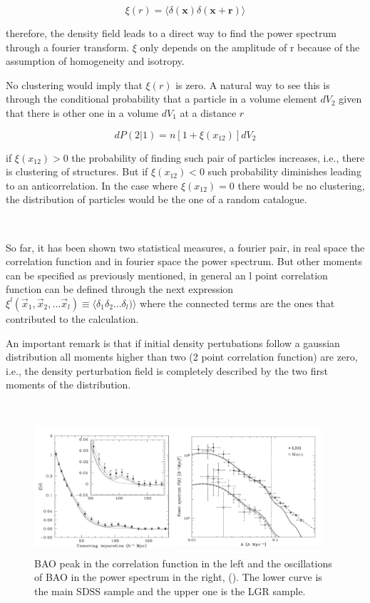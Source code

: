 \[\xi (r) =  \langle  \delta(\textbf{x})\delta(\textbf{x}+\textbf{r}) \rangle\]

therefore, the density field leads to a direct way to find the power spectrum through a fourier 
transform. $\xi$ only depends on the amplitude of r because of the assumption of homogeneity
and isotropy. 

No clustering would imply that $\xi(r)$ is zero. A natural way to see this is through
the conditional probability that a particle in a volume element $dV_2$ given that there 
is other one in a volume $dV_1$ at a distance $r$ 

\[dP(2|1) = n[1+\xi(x_{12})]dV_2\]

if $\xi(x_{12})>0$ the probability of finding such pair of particles increases,
i.e., there is clustering of structures. But if $\xi(x_{12})<0$ such probability 
diminishes leading to an anticorrelation.  In the case where $\xi(x_{12})=0$ 
there would be no clustering, the distribution of particles would be the one of 
a random catalogue. 

\
 
So far, it has been shown two statistical measures, a fourier pair, in real space the 
correlation function and in fourier space the power spectrum. 
But other moments can be specified as previously mentioned, in general an l point 
correlation function can be defined through the next expression 
$\xi^l(\vec{x}_1,\vec{x}_2,\ldots \vec{x}_l) \equiv  \langle  \delta_1\delta_2 \ldots\delta_l)\rangle $ where the connected terms are the ones that contributed to the calculation.

An important remark is that if initial density pertubations follow a gaussian distribution 
all moments higher than two (2 point correlation function) are zero, i.e., the density
perturbation field is completely described by the two first moments of the distribution. 

\


\begin{figure}[htbp]
       \centering
               \includegraphics[width=0.95\textwidth]{./Images/chapter2/PS_CF.png}
       \caption{\small BAO peak in the correlation function in the left and the oscillations of BAO in the power spectrum in the right,
       (\cite{PLOT}).  
       The lower curve is the main SDSS sample and the upper one is the LGR sample. }
       \label{ps_cf}
 \end{figure}

